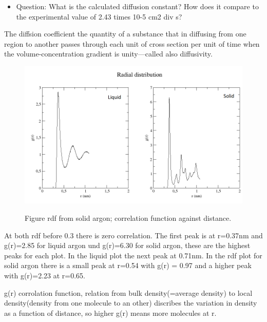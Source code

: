 \documentclass[10pt, a4paper, oneside, twocolumn]{article}
\begin{document}
\begin{itemize}
	\item Question: What is the calculated diffusion constant? How does it compare to the experimental value of 2.43 times 10-5 cm2 div s?
\end{itemize}


The diffsion coefficient the quantity of a substance that in diffusing from one region to another passes through each unit of cross section per unit of time when the volume-concentration gradient is unity—called also diffusivity.       

\begin{figure}
	\centering
		\includegraphics[width=\linewidth]{plots/rdf.png}
		\label{fig:1a}
\caption{Figure rdf from solid argon; correlation function against distance.}
\end{figure}

At both rdf before 0.3 there is zero correlation. The first peak is at r=0.37nm and g(r)=2.85 for liquid argon und g(r)=6.30 for solid argon, these are the highest peaks for each plot. In the liquid plot the next peak at 0.71nm. In the rdf plot for solid argon there is a small peak at r=0.54 with g(r) = 0.97 and a higher peak with g(r)=2.23 at r=0.65.

g(r) corrolation function, relation from bulk density(=average density) to local density(density from one molecule to an other) discribes the variation in density as a function of distance, so higher g(r) means more molecules at r.
\end{document}
